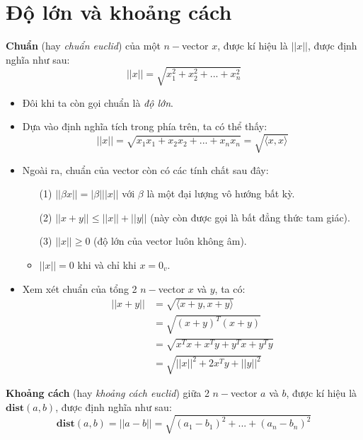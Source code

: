 \section{Độ lớn và khoảng cách}

\begin{defivn}
    \textbf{Chuẩn} (hay \textit{chuẩn euclid}) của một $n-$vector $x$, được kí hiệu là $||x||$, được định nghĩa như sau:
    $$
    ||x|| = \sqrt{x_1^2 + x_2^2 + ... + x_n^2}
    $$
\end{defivn}

\begin{itemize}
    \item Đôi khi ta còn gọi chuẩn là \textit{độ lớn}.

    \item Dựa vào định nghĩa tích trong phía trên, ta có thể thấy:
    $$
    ||x|| = \sqrt{x_1x_1 + x_2x_2 + ... + x_nx_n} = \sqrt{\langle x, x \rangle}
    $$

    \item Ngoài ra, chuẩn của vector còn có các tính chất sau đây:
    \begin{itemize}
        \item[(1)] $|| \beta x|| = |\beta| ||x||$ với $\beta$ là một đại lượng vô hướng bất kỳ.
        \item[(2)] $||x + y|| \leq ||x|| + ||y||$ (này còn được gọi là bất đẳng thức tam giác).
        \item[(3)] $||x|| \geq 0$ (độ lớn của vector luôn không âm).
        \item $||x|| = 0$ khi và chỉ khi $x = 0_{v}$.
    \end{itemize}

    \item Xem xét chuẩn của tổng 2 $n-$vector $x$ và $y$, ta có:
    $$
    \begin{aligned}
    ||x+y|| &= \sqrt{\langle x+y, x+y \rangle} \\
    &= \sqrt{(x+y)^T(x+y)} \\
    &= \sqrt{x^Tx + x^Ty + y^Tx + y^Ty} \\
    &= \sqrt{||x||^2 + 2x^Ty + ||y||^2}
    \end{aligned}
    $$
\end{itemize}

\begin{defivn}
    \textbf{Khoảng cách} (hay \textit{khoảng cách euclid}) giữa 2 $n-$vector $a$ và $b$, được kí hiệu là $\textbf{dist}(a,b)$, được định nghĩa như sau:
    $$
    \textbf{dist}(a,b) = ||a - b|| = \sqrt{(a_1 - b_1)^2 + ... + (a_n - b_n)^2}
    $$
\end{defivn}

